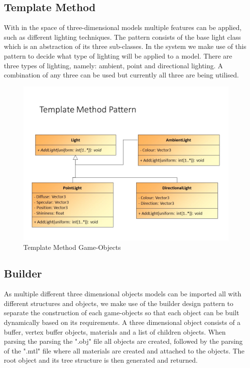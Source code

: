 \subsection{Template Method}
With in the space of three-dimensional models multiple features can be applied, such as different lighting techniques. The pattern consists of the base light class which is an abstraction of its three sub-classes. In the system we make use of this pattern to decide what type of lighting will be applied to a model. There are three types of lighting, namely: ambient, point and directional lighting. A combination of any three can be used but currently all three are being utilised.

\begin{figure}[!ht]
	\centering
	\includegraphics[scale=0.5]{Diagrams/Slide8.jpg}
	\caption{Template Method Game-Objects}
\end{figure}

\subsection{Builder}
As multiple different three dimensional objects models can be imported all with different structures and objects, we make use of the builder design pattern to separate the construction of each game-objects so that each object can be built dynamically based on its requirements. A three dimensional object consists of a buffer, vertex buffer objects, materials and a list of children objects. When parsing the parsing the ".obj" file all objects are created, followed by the parsing of the ".mtl" file where all materials are created and attached to the objects. The root object and its tree structure is then generated and returned.

